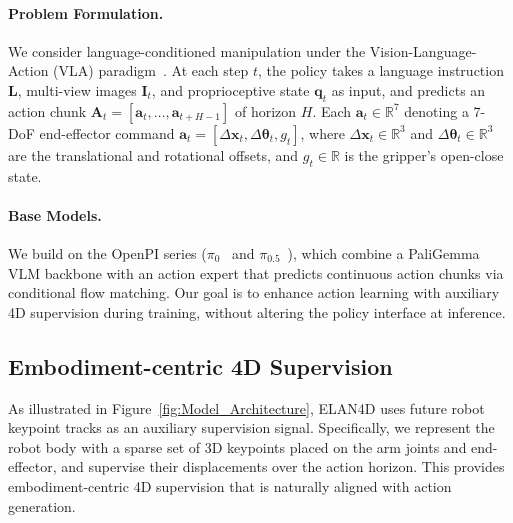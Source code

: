 \paragraph{Problem Formulation.} We consider language-conditioned manipulation under the Vision-Language-Action (VLA) paradigm~\citep{kim2025openvla,black2410pi0}. At each step $t$, the policy takes a language instruction $\mathbf{L}$, multi-view images $\mathbf{I}_t$, and proprioceptive state $\mathbf{q}_t$ as input, and predicts an action chunk $\mathbf{A}_t = [\mathbf{a}_t, \dots, \mathbf{a}_{t+H-1}]$ of horizon $H$. Each $\mathbf{a}_t \in \mathbb{R}^7$ denoting a 7-DoF end-effector command $\mathbf{a}_t = [\Delta \mathbf{x}_t, \Delta \boldsymbol{\theta}_t, g_t]$, where $\Delta \mathbf{x}_t \in \mathbb{R}^3$ and $\Delta \boldsymbol{\theta}_t \in \mathbb{R}^3$ are the translational and rotational offsets, and $g_t \in \mathbb{R}$ is the gripper's open-close state.\vspace{-1em}
\paragraph{Base Models.} We build on the OpenPI series ($\pi_0$~\citep{black2410pi0} and $\pi_{0.5}$~\citep{black2025pi}), which combine a PaliGemma~\citep{beyer2024paligemma} VLM backbone with an action expert that predicts continuous action chunks via conditional flow matching. Our goal is to enhance action learning with auxiliary 4D supervision during training, without altering the policy interface at inference.

\subsection{Embodiment-centric 4D Supervision}
\label{sec:4d_signal}
As illustrated in Figure~\ref{fig:Model_Architecture}, ELAN4D uses future robot keypoint tracks as an auxiliary supervision signal. Specifically, we represent the robot body with a sparse set of 3D keypoints placed on the arm joints and end-effector, and supervise their displacements over the action horizon. This provides embodiment-centric 4D supervision that is naturally aligned with action generation.\vspace{-1em}

